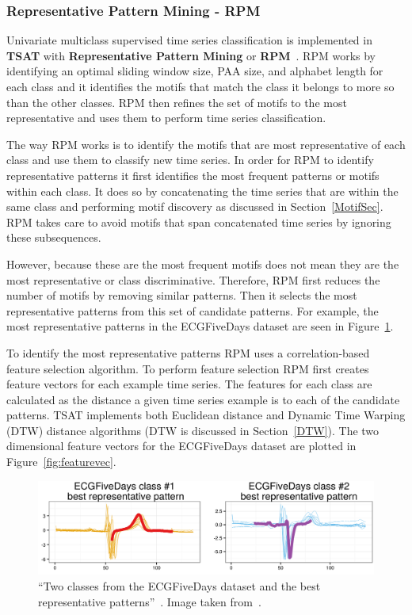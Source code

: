 \documentclass[titlepage, letterpaper, 12pt]{article}
\newcommand\TSAT{\textbf{TSAT}}
\begin{document}
\subsubsection{Representative Pattern Mining - RPM}
\label{RPMOverview}

Univariate multiclass supervised time series classification is implemented in {\TSAT} with \textbf{Representative Pattern Mining} or \textbf{RPM}~\cite{wang2016rpm}.  RPM works by identifying an optimal sliding window size, PAA size, and alphabet length for each class and it identifies the motifs that match the class it belongs to more so than the other classes.  RPM then refines the set of motifs to the most representative and uses them to perform time series classification.

The way RPM works is to identify the motifs that are most representative of each class and use them to classify new time series.  In order for RPM to identify representative patterns it first identifies the most frequent patterns or motifs within each class.  It does so by concatenating the time series that are within the same class and performing motif discovery as discussed in Section~\ref{MotifSec}.  RPM takes care to avoid motifs that span concatenated time series by ignoring these subsequences.

However, because these are the most frequent motifs does not mean they are the most representative or class discriminative.  Therefore, RPM first reduces the number of motifs by removing similar patterns.  Then it selects the most representative patterns from this set of candidate patterns.  For example, the most representative patterns in the ECGFiveDays dataset are seen in Figure~\ref{fig:representativepatterns}.

To identify the most representative patterns RPM uses a correlation-based feature selection algorithm. To perform feature selection RPM first creates feature vectors for each example time series. The features for each class are calculated as the distance a given time series example is to each of the candidate patterns.  TSAT implements both Euclidean distance and Dynamic Time Warping (DTW) distance algorithms (DTW is discussed in Section~\ref{DTW}).  The two dimensional feature vectors for the ECGFiveDays dataset are plotted in Figure~\ref{fig:featurevec}.

\begin{figure}[H]
	\centering
	\includegraphics[width=.7\textwidth]{pictures/representativepatterns}
	\caption{``Two classes from the ECGFiveDays dataset and the best representative patterns''~\cite{wang2016rpm}.  Image taken from~\cite{wang2016rpm}.}
	\label{fig:representativepatterns}
\end{figure}
\end{document}
